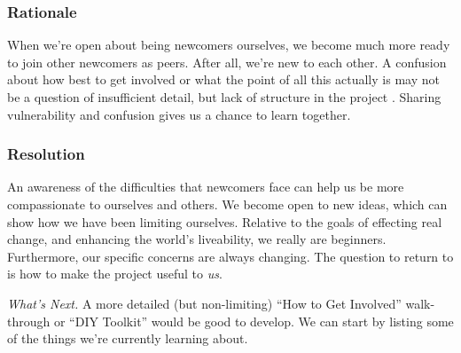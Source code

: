 %
\subsubsection*{Rationale} 
When we're open about being newcomers ourselves, we become much more
ready to join other newcomers as peers.  After all, we're new to each other.  A
 confusion about how best to get involved
or what the point of all this actually is may not be a question of
insufficient detail, but lack of structure in the project
.  Sharing vulnerability and confusion gives us a chance to learn together.
%

\subsubsection*{Resolution}
An awareness of the difficulties that newcomers face can
help us be more compassionate to ourselves and others.  We
become open to new ideas, which can show how we have
been limiting ourselves.
%
Relative to the goals of effecting real change, and enhancing the
world's liveability, we really are beginners.  Furthermore, our
specific concerns are always changing.  The question to return to is
how to make the project useful to \emph{us}.

\begin{framed}
\emph{What's Next.}
A more detailed (but non-limiting) ``How to Get Involved'' walk-through or ``DIY Toolkit'' would be good to develop. We can start by listing some of the things we're currently learning about.
\end{framed}
